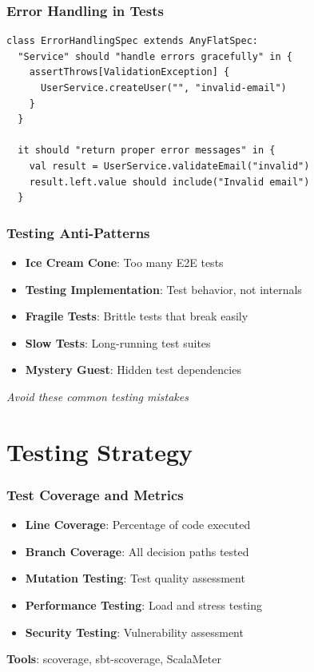 \documentclass{beamer}
\begin{document}
\begin{frame}[fragile]
\frametitle{Error Handling in Tests}

\begin{lstlisting}[style=scalaStyle]
class ErrorHandlingSpec extends AnyFlatSpec:
  "Service" should "handle errors gracefully" in {
    assertThrows[ValidationException] {
      UserService.createUser("", "invalid-email")
    }
  }
  
  it should "return proper error messages" in {
    val result = UserService.validateEmail("invalid")
    result.left.value should include("Invalid email")
  }
\end{lstlisting}

\end{frame}

\begin{frame}
\frametitle{Testing Anti-Patterns}

\begin{itemize}
  \item \textbf{Ice Cream Cone}: Too many E2E tests
  \item \textbf{Testing Implementation}: Test behavior, not internals
  \item \textbf{Fragile Tests}: Brittle tests that break easily
  \item \textbf{Slow Tests}: Long-running test suites
  \item \textbf{Mystery Guest}: Hidden test dependencies
\end{itemize}

\vspace{0.3cm}
\textit{Avoid these common testing mistakes}

\end{frame}

\section{Testing Strategy}

\begin{frame}
\frametitle{Test Coverage and Metrics}

\begin{itemize}
  \item \textbf{Line Coverage}: Percentage of code executed
  \item \textbf{Branch Coverage}: All decision paths tested
  \item \textbf{Mutation Testing}: Test quality assessment
  \item \textbf{Performance Testing}: Load and stress testing
  \item \textbf{Security Testing}: Vulnerability assessment
\end{itemize}

\vspace{0.3cm}
\textbf{Tools}: scoverage, sbt-scoverage, ScalaMeter

\end{frame}
\end{document}
